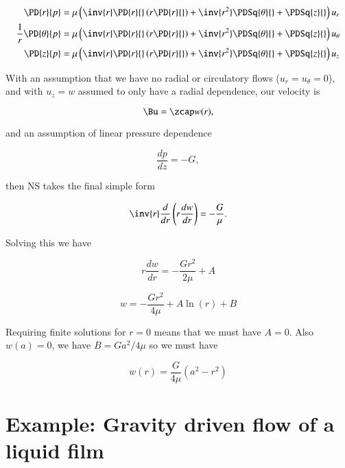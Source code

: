 \begin{align}\label{eqn:continuumL12:690}
\PD{r}{p}
&= \mu \left(
\inv{r} \PD{r}{} \left( r \PD{r}{} \right) + \inv{r^2} \PDSq{\theta}{} + \PDSq{z}{} \right)
u_r \\
\frac{1}{r} \PD{\theta}{p}
&= \mu \left(
\inv{r} \PD{r}{} \left( r \PD{r}{} \right) + \inv{r^2} \PDSq{\theta}{} + \PDSq{z}{} \right)
u_\theta \\
\PD{z}{p}
&= \mu \left(
\inv{r} \PD{r}{} \left( r \PD{r}{} \right) + \inv{r^2} \PDSq{\theta}{} + \PDSq{z}{} \right)
u_z
\end{align}

With an assumption that we have no radial or circulatory flows ($u_r = u_\theta = 0$), and with $u_z = w$ assumed to only have a radial dependence, our velocity is

\begin{equation}\label{eqn:continuumL12:50}
\Bu = \zcap w(r),
\end{equation}

and an assumption of linear pressure dependence

\begin{equation}\label{eqn:continuumL12:60}
\frac{dp}{dz} = -G,
\end{equation}

then NS takes the final simple form

\begin{equation}\label{eqn:continuumL12:70}
\inv{r} \frac{d}{dr} \left( r \frac{dw}{dr} \right) = - \frac{G}{\mu}.
\end{equation}

Solving this we have

\begin{equation}\label{eqn:continuumL12:90}
r \frac{dw}{dr} = - \frac{G r^2}{2\mu} + A
\end{equation}

\begin{equation}\label{eqn:continuumL12:110}
w = -\frac{G r^2}{4 \mu} + A \ln(r) + B
\end{equation}

Requiring finite solutions for $r = 0$ means that we must have $A = 0$.  Also $w(a) = 0$, we have $B = G a^2/4 \mu$ so we must have

\begin{equation}\label{eqn:continuumL12:130}
w(r) = \frac{G}{4 \mu}( a^2 - r^2 )
\end{equation}

\section{Example: Gravity driven flow of a liquid film}

